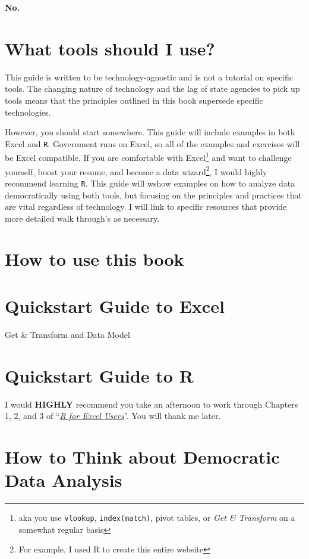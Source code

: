 \documentclass[]{book}
\begin{document}
\textbf{No.}

\section{What tools should I use?}\label{what-tools-should-i-use}

This guide is written to be technology-agnostic and is not a tutorial on
specific tools. The changing nature of technology and the lag of state
agencies to pick up tools means that the principles outlined in this
book supersede specific technologies.

However, you should start somewhere. This guide will include examples in
both Excel and \texttt{R}. Government runs on Excel, so all of the
examples and exercises will be Excel compatible. If you are comfortable
with Excel\footnote{aka you use \texttt{vlookup}, \texttt{index(match)},
  pivot tables, or \emph{Get \& Transform} on a somewhat regular basis}
and want to challenge yourself, boost your resume, and become a data
wizard\footnote{For example, I used R to create this entire website}, I
would highly recommend learning \texttt{R}. This guide will wshow
examples on how to analyze data democratically using both tools, but
focusing on the principles and practices that are vital regardless of
technology. I will link to specific resources that provide more detailed
walk through's as necessary.

\section{How to use this book}\label{how-to-use-this-book}

\section{Quickstart Guide to Excel}\label{quickstart-guide-to-excel}

Get \& Transform and Data Model

\section{Quickstart Guide to R}\label{quickstart-guide-to-r}

I would \textbf{HIGHLY} recommend you take an afternoon to work through
Chapters 1, 2, and 3 of
``\href{https://rstudio-conf-2020.github.io/r-for-excel/index.html}{\emph{R
for Excel Users}}''. You will thank me later.

\section{How to Think about Democratic Data
Analysis}\label{how-to-think-about-democratic-data-analysis}
\end{document}

